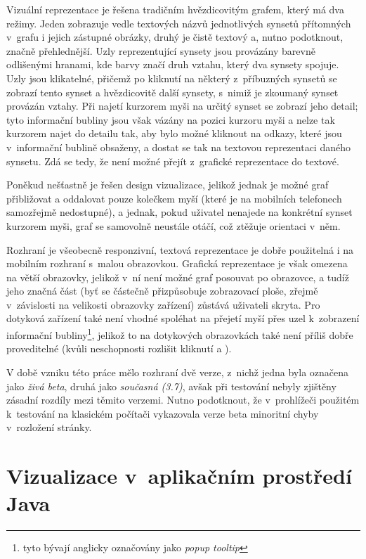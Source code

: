 \documentclass[a4paper,11pt,openany,twoside]{book}
\begin{document}
					Vizuální reprezentace je řešena tradičním hvězdicovitým grafem, který má dva režimy. Jeden zobrazuje vedle textových názvů jednotlivých synsetů přítomných v~grafu i jejich zástupné obrázky, druhý je čistě textový a, nutno podotknout, značně přehlednější. Uzly reprezentující synsety jsou provázány barevně odlišenými hranami, kde barvy značí druh vztahu, který dva synsety spojuje. Uzly jsou klikatelné, přičemž po kliknutí na některý z~příbuzných synsetů se zobrazí tento synset a hvězdicovitě další synsety, s~nimiž je zkoumaný synset provázán vztahy. Při najetí kurzorem myši na určitý synset se zobrazí jeho detail; tyto informační bubliny jsou však vázány na pozici kurzoru myši a nelze tak kurzorem najet do detailu tak, aby bylo možné kliknout na odkazy, které jsou v~informační bublině obsaženy, a dostat se tak na textovou reprezentaci daného synsetu. Zdá se tedy, že není možné přejít z~grafické reprezentace do textové.

					Poněkud nešťastně je řešen design vizualizace, jelikož jednak je možné graf přibližovat a oddalovat pouze kolečkem myší (které je na mobilních telefonech samozřejmě nedostupné), a jednak, pokud uživatel nenajede na konkrétní synset kurzorem myši, graf se samovolně neustále otáčí, což ztěžuje orientaci v~něm.

					Rozhraní je všeobecně responzivní, textová reprezentace je dobře použitelná i na mobilním rozhraní s~malou obrazovkou. Grafická reprezentace je však omezena na větší obrazovky, jelikož v~ní není možné graf posouvat po obrazovce, a tudíž jeho značná část (byť se částečně přizpůsobuje zobrazovací ploše, zřejmě v~závislosti na velikosti obrazovky zařízení) zůstává uživateli skryta. Pro dotyková zařízení také není vhodné spoléhat na přejetí myší přes uzel k~zobrazení informační bubliny\footnote{tyto bývají anglicky označovány jako \textit{popup tooltip}}, jelikož to na dotykových obrazovkách také není příliš dobře proveditelné (kvůli neschopnosti rozlišit kliknutí a ).

					V době vzniku této práce mělo rozhraní dvě verze, z~nichž jedna byla označena jako \textit{živá beta}, druhá jako \textit{současná (3.7)}, avšak při testování nebyly zjištěny zásadní rozdíly mezi těmito verzemi. Nutno  podotknout, že v~prohlížeči použitém k~testování na klasickém počítači vykazovala verze beta minoritní chyby v~rozložení stránky.

			\section{Vizualizace v~aplikačním prostředí Java}
\end{document}
